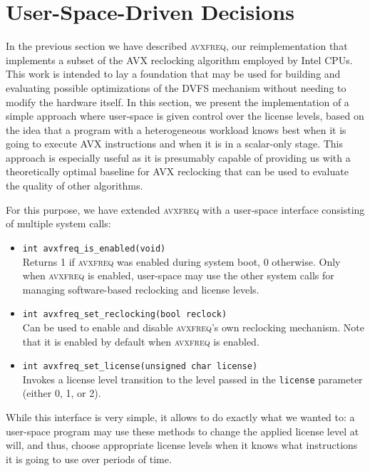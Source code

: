 
\section{User-Space-Driven Decisions}
\label{sec:design:userspacedrivendecisions}

In the previous section we have described \textsc{avxfreq}, our reimplementation that implements a subset of the \gls{AVX} reclocking algorithm employed by Intel \glspl{CPU}. This work is intended to lay a foundation that may be used for building and evaluating possible optimizations of the \gls{DVFS} mechanism without needing to modify the hardware itself. In this section, we present the implementation of a simple approach where user-space is given control over the license levels, based on the idea that a program with a heterogeneous workload knows best when it is going to execute \gls{AVX} instructions and when it is in a scalar-only stage. This approach is especially useful as it is presumably capable of providing us with a theoretically optimal baseline for \gls{AVX} reclocking that can be used to evaluate the quality of other algorithms.

For this purpose, we have extended \textsc{avxfreq} with a user-space interface consisting of multiple system calls:

\begin{itemize}
	\item \texttt{int avxfreq_is_enabled(void)} \\
		Returns 1 if \textsc{avxfreq} was enabled during system boot, 0 otherwise. Only when \textsc{avxfreq} is enabled, user-space may use the other system calls for managing software-based reclocking and license levels.
	\item \texttt{int avxfreq_set_reclocking(bool reclock)} \\
		Can be used to enable and disable \textsc{avxfreq}'s own reclocking mechanism. Note that it is enabled by default when \textsc{avxfreq} is enabled.
	\item \texttt{int avxfreq_set_license(unsigned char license)} \\
		Invokes a license level transition to the level passed in the \texttt{license} parameter (either 0, 1, or 2).
\end{itemize}

While this interface is very simple, it allows to do exactly what we wanted to: a user-space program may use these methods to change the applied license level at will, and thus, choose appropriate license levels when it knows what instructions it is going to use over periods of time.